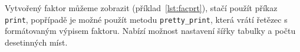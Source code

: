 %

Vytvořený faktor můžeme zobrazit (příklad~\ref{lst:facprt}), stačí použít příkaz \texttt{print}, popřípadě je možné použít metodu \texttt{pretty\_print}, která vrátí řetězec s formátovaným výpisem faktoru.
Nabízí možnost nastavení šířky tabulky a počtu desetinných míst.

\begin{example}
\begin{Verbatim}[commandchars=\\\{\}]


\end{Verbatim}
\end{example}
